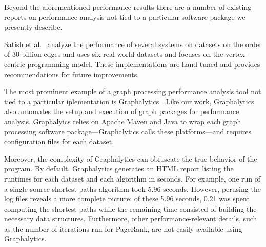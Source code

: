 \documentclass[conference]{IEEEtran}
\begin{document}
Beyond the aforementioned performance results there are a number of existing reports on performance analysis not tied to a particular software package we presently describe.

Satish et al.~\cite{Satish:2014:NavigatingGraph} analyze the performance of several systems on datasets on the order of $30$ billion edges and \cite{Lu:2014:ExperimentalEval} uses six real-world datasets and focuses on the vertex-centric programming model. These implementations are hand tuned and provides recommendations for future improvements.

The most prominent example of a graph processing performance analysis tool not tied to a particular iplementation is Graphalytics \cite{Capota:2015:Graphalytics}. Like our work, Graphalytics also automates the setup and execution of graph packages for performance analysis. Graphalyics relies on Apache Maven and Java to wrap each graph processing software package---Graphalytics calls these platforms---and requires configuration files for each dataset.

Moreover, the complexity of Graphalytics can obfuscate the true behavior of the program. By default, Graphalytics generates an HTML report listing the runtimes for each dataset and each algorithm in seconds. For example, one run of a single source shortest paths algorithm took 5.96 seconds. However, perusing the log files reveals a more complete picture: of these 5.96 seconds, 0.21 was spent computing the shortest paths while the remaining time consisted of building the necessary data structures. Furthermore, other performance-relevant details, such as the number of iterations run for PageRank, are not easily available using Graphalytics.
\end{document}

